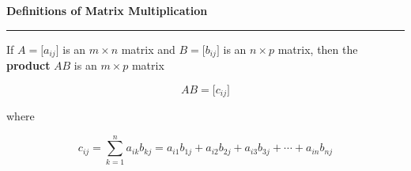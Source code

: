 \nopagenumbers
{\bf Definitions of Matrix Multiplication}
\vskip 1mm
\hrule

\vskip 6pt
If $A=\lbrack a_{ij}\rbrack$ is an $m\times n$ matrix and $B=\lbrack b_{ij}\rbrack$ is an $n\times p$ matrix, then the {\bf product} $AB$ is an $m\times p$ matrix

$$AB=\lbrack c_{ij}\rbrack$$

where

$$c_{ij}=\sum_{k=1}^na_{ik}b_{kj}=a_{i1}b_{1j}+a_{i2}b_{2j}+a_{i3}b_{3j}+\cdots+a_{in}b_{nj}$$

\vfill\eject
\bye
